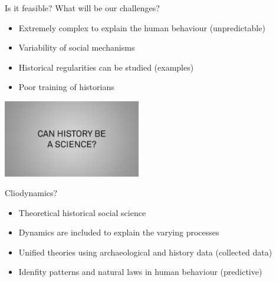 \documentclass{beamer}
\begin{document}
    \begin{frame}{Is it feasible? What will be our challenges? }

	\begin{itemize}
	    \item  Extremely complex to explain the human behaviour (unpredictable)
		   \item  Variability of social mechanisms
		   \item   Historical regularities can be studied (examples)
		   \item  Poor training of historians
	\end{itemize}
	\begin{center}
	    \includegraphics[width=6cm]{images/3}
	\end{center}
    \end{frame}

    \begin{frame}{Cliodynamics? }
	\begin{itemize}

	    \item   Theoretical historical social science
		   \item   Dynamics are included to explain the varying processes 
		   \item   Unified theories using archaeological and history data (collected data)
		   \item   Idenfity patterns and natural laws in human behaviour (predictive)
	\end{itemize}

    \end{frame}
\end{document}
